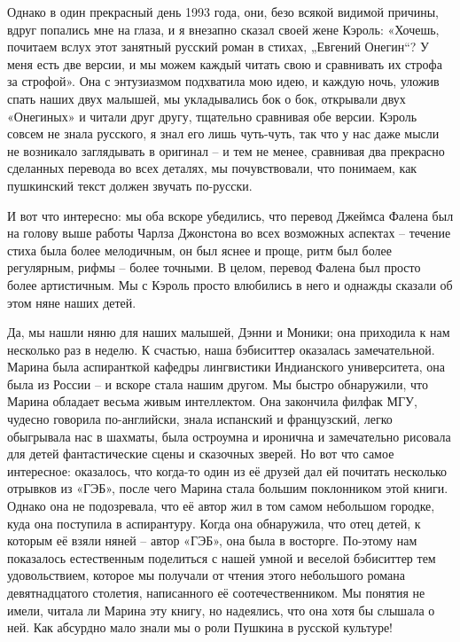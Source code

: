 \documentclass[../main.tex]{subfiles}
\begin{document}
Однако в один прекрасный день 1993 года, они, безо всякой видимой причины, вдруг попались мне на глаза, и я внезапно сказал своей жене Кэроль: «Хочешь, почитаем вслух этот занятный русский роман в стихах, „Евгений Онегин``?
У меня есть две версии, и мы можем каждый читать свою и сравнивать их строфа за строфой».
Она с энтузиазмом подхватила мою идею, и каждую ночь, уложив спать наших двух малышей, мы укладывались бок о бок, открывали двух «Онегиных» и читали друг другу, тщательно сравнивая обе версии.
Кэроль совсем не знала русского, я знал его лишь чуть-чуть, так что у нас даже мысли не возникало заглядывать в оригинал \--- и тем не менее, сравнивая два прекрасно сделанных перевода во всех деталях, мы почувствовали, что понимаем, как пушкинский текст должен звучать по-русски.

И вот что интересно: мы оба вскоре убедились, что перевод Джеймса Фалена был на голову выше работы Чарлза Джонстона во всех возможных аспектах \--- течение стиха была более мелодичным, он был яснее и проще, ритм был более регулярным, рифмы \--- более точными.
В целом, перевод Фалена был просто более артистичным.
Мы с Кэроль просто влюбились в него и однажды сказали об этом няне наших детей.

Да, мы нашли няню для наших малышей, Дэнни и Моники; она приходила к нам несколько раз в неделю.
К счастью, наша бэбиситтер оказалась замечательной.
Марина была аспиранткой кафедры лингвистики Индианского университета, она была из России \--- и вскоре стала нашим другом.
Мы быстро обнаружили, что Марина обладает весьма живым интеллектом.
Она закончила филфак МГУ, чудесно говорила по-английски, знала испанский и французский, легко обыгрывала нас в шахматы, была остроумна и иронична и замечательно рисовала для детей фантастические сцены и сказочных зверей.
Но вот что самое интересное: оказалось, что когда-то один из её друзей дал ей почитать несколько отрывков из «ГЭБ», после чего Марина стала большим поклонником этой книги.
Однако она не подозревала, что её автор жил в том самом небольшом городке, куда она поступила в аспирантуру.
Когда она обнаружила, что отец детей, к которым её взяли няней \--- автор «ГЭБ», она была в восторге.
По-этому нам показалось естественным поделиться с нашей умной и веселой бэбиситтер тем удовольствием, которое мы получали от чтения этого небольшого романа девятнадцатого столетия, написанного её соотечественником.
Мы понятия не имели, читала ли Марина эту книгу, но надеялись, что она хотя бы слышала о ней.
Как абсурдно мало знали мы о роли Пушкина в русской культуре!
\end{document}
